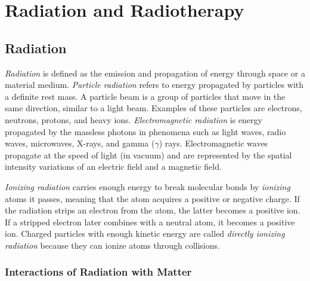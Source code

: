 \documentclass[../main/thesis.tex]{subfiles}
\begin{document}
\newchapter


\chapter{Radiation and Radiotherapy}
\label{theory}
\section{Radiation}
\label{t-radiation}
\textit{Radiation} is defined as the emission and propagation of energy through space or a material medium. \textit{Particle radiation} refers to energy propagated by particles with a definite rest mass. A particle beam is a group of particles that move in the same direction, similar to a light beam. Examples of these particles are electrons, neutrons, protons, and heavy ions. \textit{Electromagnetic radiation} is energy propagated  by the massless photons in phenomena such as light waves, radio waves, microwaves, X-rays, and gamma ($\gamma$) rays. Electromagnetic waves propagate at the speed of light (in vacuum) and are represented by the spatial intensity variations of an electric field and a magnetic field. \citep[chap. 1]{Khan} 

\textit{Ionizing radiation} carries enough energy to break molecular bonds by \textit{ionizing} atoms it passes, meaning that the atom acquires a positive or negative charge. If the radiation strips an electron from the atom, the latter becomes a positive ion. If a stripped electron later combines with a neutral atom, it becomes a positive ion. Charged particles with enough kinetic energy are called \textit{directly ionizing radiation} because they can ionize atoms through collisions. \citep[chap. 5]{Khan}



\subsection{Interactions of Radiation with Matter}
\label{t-int}
\end{document}
